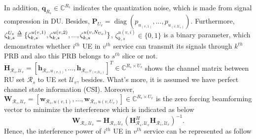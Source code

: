 \documentclass[conference]{IEEEtran}
\def\delequal{\mathrel{\ensurestackMath{\stackon[1pt]{=}{\scriptstyle\Delta}}}}
\newcommand{\diag}{\mathop{\mathrm{diag}}}
\begin{document}
In addition, $\boldsymbol{q}_{R_s} \in \mathbb{C}^{{R}_s }  $ indicates the quantization noise, which is made from signal compression in DU.
Besides, $\boldsymbol{P}_{U_v} = \diag{(p_{u_{(v,1)}}, ..., p_{u_{(v,\mathcal{U}_v)}})}$.
\newline
Furthermore, $\zeta_{k,s}^{U_v} \delequal \{\zeta_{k,s}^{u(v,1)},\zeta_{k,s}^{u(v,2)},...,\zeta_{k,s}^{u(v,N_{U_v})}\}$,
$\zeta_{k,s}^{u(v,i)} \in \{0,1\}$ is a binary parameter, which demonstrates whether $i^{th}$ UE in $v^{th}$ service can transmit its signals through $k^{th}$ PRB and also this PRB belongs to $s^{th}$ slice or not.
$\boldsymbol{H}_{\mathcal{R}_s,\mathcal{U}_v}=\left[\boldsymbol{h}_{\mathcal{R}_s,u_{(v,1)}},\ldots,\boldsymbol{h}_{\mathcal{R}_s,v_{(v,\mathcal{U}_v)}}\right]^T  \in \mathbb{C}^{{R}_s\times {U}_v }$
shows the channel matrix between RU set $\mathcal{R}_s$ to UE set
$\mathcal{U}_v$, besides.
What's more, it is assumed we have perfect channel state information (CSI).\newline
Moreover, $\boldsymbol{W}_{\mathcal{R}_s,\mathcal{U}_v} = [\boldsymbol{w}_{\mathcal{R}_s,u(v,1)},...,\boldsymbol{w}_{\mathcal{R}_s,u(v,U_v)}] \in \mathbb{C}^{{R}_s\times U_v} $ is the zero forcing beamforming vector to minimize the interference which is indicated as below
\begin{equation}
\textstyle \boldsymbol{W}_{\mathcal{R}_s,\mathcal{U}_v} = \boldsymbol{H}_{\mathcal{R}_s,\mathcal{U}_v}(\boldsymbol{H}_{\mathcal{R}_s,\mathcal{U}_v}^H \boldsymbol{H}_{\mathcal{R}_s,\mathcal{U}_v})^{-1}.
\end{equation}
Hence, the interference power of $i^{th}$ UE in $v^{th}$ service can be represented as follow
\end{document}
